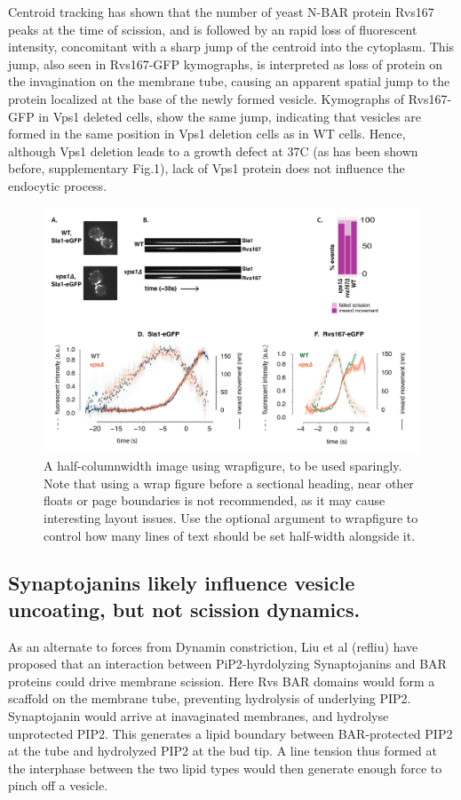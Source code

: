 \documentclass[9pt,lineno]{elife}
\begin{document}
Centroid tracking has shown that the number of yeast N-BAR protein Rvs167 peaks at the time of scission, and is followed by an rapid loss of fluorescent intensity, concomitant with a sharp jump of the centroid into the cytoplasm. This jump, also seen in Rvs167-GFP kymographs, is interpreted as loss of protein on the invagination on the membrane tube, causing an apparent spatial jump to the protein localized at the base of the newly formed vesicle. Kymographs of Rvs167-GFP in Vps1 deleted cells, show the same jump, indicating that vesicles are formed in the same position in Vps1 deletion cells as in WT cells. Hence, although Vps1 deletion leads to a growth defect at 37C (as has been shown before, supplementary Fig.1), lack of Vps1 protein does not influence the endocytic process.

\begin{figure}
	\includegraphics[width=\hsize]{figures/vpsdel_2}
	\caption{A half-columnwidth image using wrapfigure, to be used sparingly. Note that using a wrap figure before a sectional heading, near other floats or page boundaries is not recommended, as it may cause interesting layout issues. Use the optional argument to wrapfigure to control how many lines of text should be set half-width alongside it.}
	\label{fig:halfwidth}
\end{figure}

\subsection{Synaptojanins likely influence vesicle uncoating, but not scission dynamics.}

As an alternate to forces from Dynamin constriction, Liu et al (refliu) have proposed that an interaction between PiP2-hyrdolyzing Synaptojanins and BAR proteins could drive membrane scission. Here Rvs BAR domains would form a scaffold on the membrane tube, preventing hydrolysis of underlying PIP2. Synaptojanin would arrive at inavaginated membranes, and hydrolyse unprotected PIP2. This generates a lipid boundary between BAR-protected PIP2 at the tube and hydrolyzed PIP2 at the bud tip. A line tension thus formed at the interphase between the two lipid types would then generate enough force to pinch off a vesicle.
\end{document}

